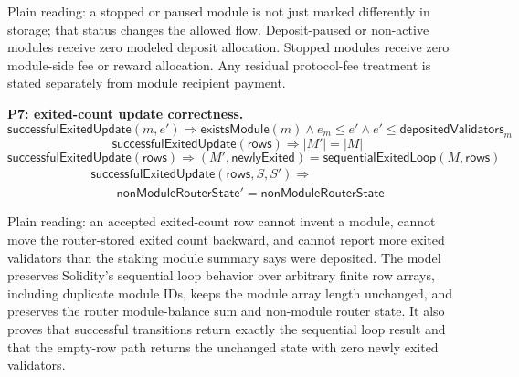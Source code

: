 \noindent Plain reading: a stopped or paused module is not just marked differently
in storage; that status changes the allowed flow. Deposit-paused or non-active
modules receive zero modeled deposit allocation. Stopped modules receive zero
module-side fee or reward allocation. Any residual protocol-fee treatment is
stated separately from module recipient payment.

\medskip
\noindent\textbf{P7: exited-count update correctness.}
\[
  \mathsf{successfulExitedUpdate}(m,e')
  \Rightarrow
  \mathsf{existsModule}(m)
  \land e_m \leq e'
  \land e' \leq \mathsf{depositedValidators}_m
\]
\[
  \mathsf{successfulExitedUpdate}(\mathsf{rows})
  \Rightarrow
  |M'| = |M|
\]
\[
  \mathsf{successfulExitedUpdate}(\mathsf{rows})
  \Rightarrow
  (M',\mathsf{newlyExited})=\mathsf{sequentialExitedLoop}(M,\mathsf{rows})
\]
\[
  \begin{array}{l}
  \mathsf{successfulExitedUpdate}(\mathsf{rows},S,S')
  \Rightarrow \\
  \qquad
  \mathsf{nonModuleRouterState}' = \mathsf{nonModuleRouterState}
  \end{array}
\]

\noindent Plain reading: an accepted exited-count row cannot invent a module,
cannot move the router-stored exited count backward, and cannot report more
exited validators than the staking module summary says were deposited. The model
preserves Solidity's sequential loop behavior over arbitrary finite row arrays,
including duplicate module IDs, keeps the module array length unchanged, and
preserves the router module-balance sum and non-module router state. It also
proves that successful transitions return exactly the sequential loop result and
that the empty-row path returns the unchanged state with zero newly exited
validators.

